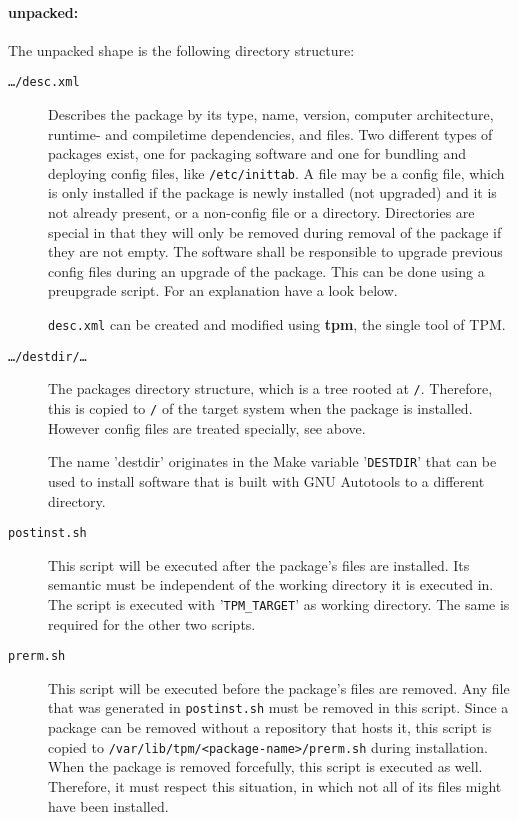 \documentclass[a4paper]{article}
\newcommand{\file}[1]{\texttt{#1}}
\newcommand{\program}[1]{\textbf{#1}}
\newcommand{\variable}[1]{'\texttt{#1}'}
\begin{document}
	\paragraph{unpacked:}
	The unpacked shape is the following directory structure:
	\begin{description}
		\item[\file{\dots/desc.xml}] Describes the package by its type, name, version, computer architecture, runtime- and compiletime dependencies, and files. Two different types of packages exist, one for packaging software and one for bundling and deploying config files, like \file{/etc/inittab}. A file may be a config file, which is only installed if the package is newly installed (not upgraded) and it is not already present, or a non-config file or a directory. Directories are special in that they will only be removed during removal of the package if they are not empty. The software shall be responsible to upgrade previous config files during an upgrade of the package. This can be done using a preupgrade script. For an explanation have a look below.
		
		\file{desc.xml} can be created and modified using \program{tpm}, the single tool of TPM.
		
		\item[\file{\dots/destdir/\dots}] The packages directory structure, which is a tree rooted at \file{/}. Therefore, this is copied to \file{/} of the target system when the package is installed. However config files are treated specially, see above.
		
		The name 'destdir' originates in the Make variable \variable{DESTDIR} that can be used to install software that is built with GNU Autotools to a different directory.
		
		\item[\file{postinst.sh}] This script will be executed after the package's files are installed. Its semantic must be independent of the working directory it is executed in. The script is executed with \variable{TPM\_TARGET} as working directory. The same is required for the other two scripts.
		
		\item[\file{prerm.sh}] This script will be executed before the package's files are removed. Any file that was generated in \file{postinst.sh} must be removed in this script. Since a package can be removed without a repository that hosts it, this script is copied to \file{/var/lib/tpm/<package-name>/prerm.sh} during installation. When the package is removed forcefully, this script is executed as well. Therefore, it must respect this situation, in which not all of its files might have been installed.
		

\end{description}
\end{document}

